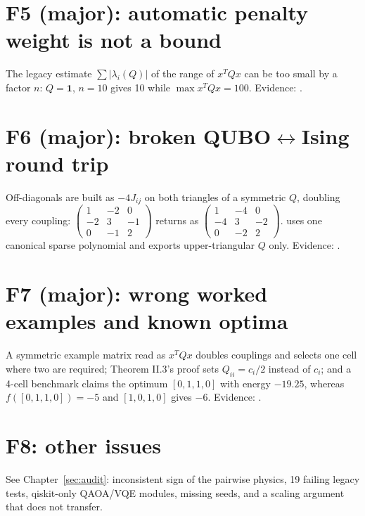 \section*{F5 (major): automatic penalty weight is not a bound}
The legacy estimate $\sum|\lambda_i(Q)|$ of the range of $x^TQx$ can be too small by a factor $n$:
$Q=\mathbf{1}$, $n=10$ gives 10 while $\max x^TQx=100$. Evidence: .

\section*{F6 (major): broken QUBO$\leftrightarrow$Ising round trip}
Off-diagonals are built as $-4J_{ij}$ on both triangles of a symmetric $Q$, doubling every coupling:
$\begin{pmatrix}1&-2&0\\-2&3&-1\\0&-1&2\end{pmatrix}$ returns as
$\begin{pmatrix}1&-4&0\\-4&3&-2\\0&-2&2\end{pmatrix}$.  uses one canonical sparse polynomial
and exports upper-triangular $Q$ only. Evidence: .

\section*{F7 (major): wrong worked examples and known optima}
A symmetric example matrix read as $x^TQx$ doubles couplings and selects one cell where two are
required; Theorem II.3's proof sets $Q_{ii}=c_i/2$ instead of $c_i$; and a 4-cell benchmark claims the
optimum $[0,1,1,0]$ with energy $-19.25$, whereas $f([0,1,1,0])=-5$ and $[1,0,1,0]$ gives $-6$.
Evidence: .

\section*{F8: other issues}
See Chapter~\ref{sec:audit}: inconsistent sign of the pairwise physics, 19 failing legacy tests,
qiskit-only QAOA/VQE modules, missing seeds, and a scaling argument that does not transfer.

